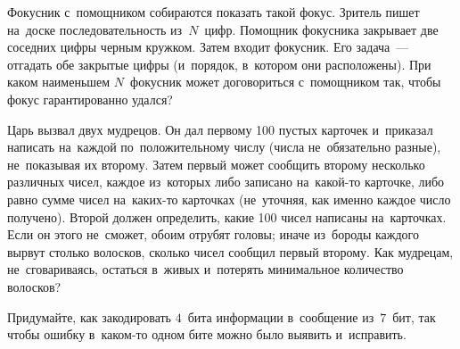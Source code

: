\begin{problems}
\item
Фокусник с~помощником собираются показать такой фокус.
Зритель пишет на~доске последовательность из~$N$~цифр.
Помощник фокусника закрывает две соседних цифры черным кружком.
Затем входит фокусник.
Его задача~--- отгадать обе закрытые цифры (и~порядок, в~котором они
расположены).
При каком наименьшем $N$~фокусник может договориться с~помощником так, чтобы
фокус гарантированно удался?

\item
Царь вызвал двух мудрецов.
Он дал первому 100 пустых карточек и~приказал написать на~каждой
по~положительному числу (числа не~обязательно разные), не~показывая их второму.
Затем первый может сообщить второму несколько различных чисел, каждое
из~которых либо записано на~какой-то карточке, либо равно сумме чисел
на~каких-то карточках (не~уточняя, как именно каждое число получено).
Второй должен определить, какие 100 чисел написаны на~карточках.
Если он этого не~сможет, обоим отрубят головы;
иначе из~бороды каждого вырвут столько волосков, сколько чисел сообщил первый
второму.
Как мудрецам, не~сговариваясь, остаться в~живых и~потерять минимальное
количество волосков?

\item
Придумайте, как закодировать $4$~бита информации в~сообщение из~$7$~бит, так
чтобы ошибку в~каком-то одном бите можно было выявить и~исправить.

\end{problems}

